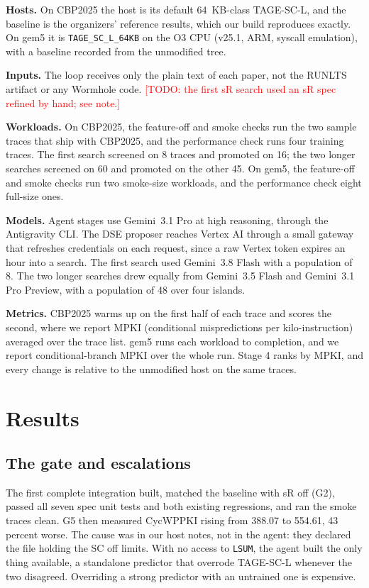 \documentclass[conference]{IEEEtran}
\newcommand{\todo}[1]{\textcolor{red}{[TODO: #1]}}
\begin{document}
\textbf{Hosts.} On CBP2025 the host is its default 64~KB-class TAGE-SC-L, and
the baseline is the organizers' reference results, which our build reproduces
exactly. On gem5 it is \texttt{TAGE\_SC\_L\_64KB} on the O3 CPU (v25.1, ARM,
syscall emulation), with a baseline recorded from the unmodified tree.

\textbf{Inputs.} The loop receives only the plain text of each paper, not the
RUNLTS artifact or any Wormhole code. \todo{the first sR search used an sR
spec refined by hand; see note.}

\textbf{Workloads.} On CBP2025, the feature-off and smoke checks run the two
sample traces that ship with CBP2025, and the performance check runs four
training traces. The first search screened on 8 traces and promoted on 16; the
two longer searches screened on 60 and promoted on the other 45. On gem5, the
feature-off and smoke checks run two smoke-size workloads, and the performance
check eight full-size ones.

\textbf{Models.} Agent stages use Gemini~3.1 Pro at high reasoning, through
the Antigravity CLI. The DSE proposer reaches Vertex AI through a small
gateway that refreshes credentials on each request, since a raw Vertex token
expires an hour into a search. The first search used Gemini~3.8 Flash with a
population of 8. The two longer searches drew equally from Gemini~3.5 Flash
and Gemini~3.1 Pro Preview, with a population of 48 over four islands.

\textbf{Metrics.} CBP2025 warms up on the first half of each trace and scores
the second, where we report MPKI (conditional mispredictions per
kilo-instruction) averaged over the trace list. gem5 runs each workload to
completion, and we report conditional-branch MPKI over the whole run. Stage 4
ranks by MPKI, and every change is relative to the unmodified host on the same
traces.

\section{Results}\label{sec:results}

\subsection{The gate and escalations}

The first complete integration built, matched the baseline with sR off (G2),
passed all seven spec unit tests and both existing regressions, and ran the
smoke traces clean. G5 then measured CycWPPKI rising from 388.07 to 554.61, 43
percent worse. The cause was in our host notes, not in the agent: they declared
the file holding the SC off limits. With no access to \texttt{LSUM}, the agent
built the only thing available, a standalone predictor that overrode TAGE-SC-L
whenever the two disagreed. Overriding a strong predictor with an untrained one
is expensive.
\end{document}
